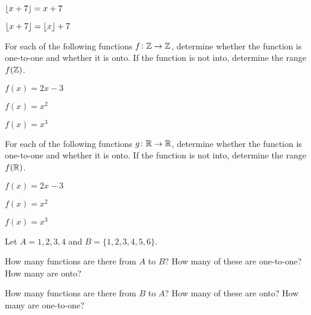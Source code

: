 \documentclass[a4paper, english, 12pt]{article} %
\begin{document}
\begin{subproblem}
  $\lfloor x + 7\rfloor = x + 7$
\end{subproblem}

\begin{subproblem}
  $\lfloor x + 7\rfloor = \lfloor x\rfloor + 7$
\end{subproblem}



\begin{problem}[2]
  For each of the following functions $f \colon \mathbb{Z} \to \mathbb{Z}$, determine whether
  the function is one-to-one and whether it is onto. If the function is not
  into, determine the range $f(\mathbb{Z})$.
\end{problem}

\begin{subproblem}[2]
  $f(x) = 2x - 3$
\end{subproblem}

\begin{subproblem}[4]
  $f(x) = x^2$
\end{subproblem}

\begin{subproblem}
  $f(x) = x^3$
\end{subproblem}

\begin{problem}
  For each of the following functions $g \colon \mathbb{R} \to \mathbb{R}$, determine whether
  the function is one-to-one and whether it is onto. If the function is not
  into, determine the range $f(\mathbb{R})$.
\end{problem}

\begin{subproblem}[2]
  $f(x) = 2x - 3$
\end{subproblem}

\begin{subproblem}[4]
  $f(x) = x^2$
\end{subproblem}

\begin{subproblem}
  $f(x) = x^3$
\end{subproblem}

\begin{problem}
  Let $A = {1, 2, 3, 4}$ and $B = \{1, 2, 3, 4, 5, 6\}$.
\end{problem}

\begin{subproblem}
  How many functions are there from $A$ to $B$? How many of these are
  one-to-one? How many are onto?
\end{subproblem}

\begin{subproblem}
  How many functions are there from $B$ to $A$? How many of these are
  onto? How many are one-to-one?
\end{subproblem}
\end{document}
